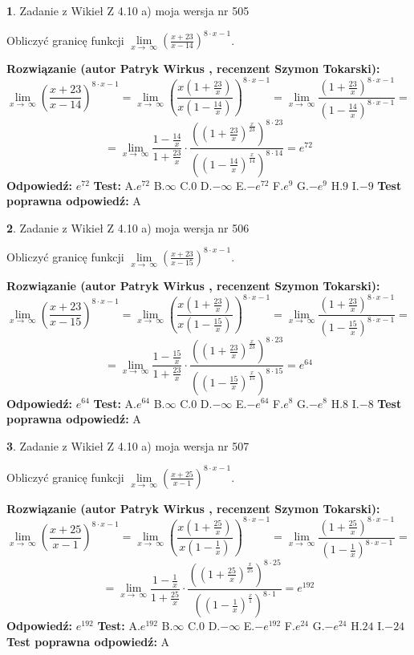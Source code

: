 \documentclass[12pt, a4paper]{article}
\theoremstyle{definition} %
\newtheorem{zad}{}
\newcommand{\zadStart}[1]{\begin{zad}#1\newline}
\newcommand{\zadStop}{\end{zad}}
\newcommand{\rozwStart}[2]{\noindent \textbf{Rozwiązanie (autor #1 , recenzent #2): }\newline}
\newcommand{\rozwStop}{\newline}
\newcommand{\odpStart}{\noindent \textbf{Odpowiedź:}\newline}
\newcommand{\odpStop}{\newline}
\newcommand{\testStart}{\noindent \textbf{Test:}\newline}
\newcommand{\testStop}{\newline}
\newcommand{\kluczStart}{\noindent \textbf{Test poprawna odpowiedź:}\newline}
\newcommand{\kluczStop}{\newline}
\begin{document}
\zadStart{Zadanie z Wikieł Z 4.10 a) moja wersja nr 505}

Obliczyć granicę funkcji  $\lim\limits_{x\to\ \infty}(\frac{x+23}{x-14})^{8\cdot x-1}$.
\zadStop
\rozwStart{Patryk Wirkus}{Szymon Tokarski}
$$\lim\limits_{x\to\ \infty}(\frac{x+23}{x-14})^{8\cdot x-1} = \lim\limits_{x\to\ \infty}(\frac{x(1+\frac{23}{x})}{x(1-\frac{14}{x})})^{8\cdot x-1}=\lim\limits_{x\to\ \infty}\frac{(1+\frac{23}{x})^{8\cdot x-1}}{(1-\frac{14}{x})^{8\cdot x-1}}=$$
$$=\lim\limits_{x\to\ \infty}\frac{1-\frac{14}{x}}{1+\frac{23}{x}}\cdot\frac{((1+\frac{23}{x})^{\frac{x}{23}})^{8\cdot23}}{((1-\frac{14}{x})^{\frac{x}{14}})^{8\cdot14}}=e^{72}$$
\rozwStop
\odpStart
$e^{72}$
\odpStop
\testStart
A.$e^{72}$ B.$\infty$ C.$0$ D.$-\infty$ E.$-e^{72}$
F.$e^{9}$ G.$-e^{9}$
H.$9$
I.$-9$
\testStop
\kluczStart
A
\kluczStop



\zadStart{Zadanie z Wikieł Z 4.10 a) moja wersja nr 506}

Obliczyć granicę funkcji  $\lim\limits_{x\to\ \infty}(\frac{x+23}{x-15})^{8\cdot x-1}$.
\zadStop
\rozwStart{Patryk Wirkus}{Szymon Tokarski}
$$\lim\limits_{x\to\ \infty}(\frac{x+23}{x-15})^{8\cdot x-1} = \lim\limits_{x\to\ \infty}(\frac{x(1+\frac{23}{x})}{x(1-\frac{15}{x})})^{8\cdot x-1}=\lim\limits_{x\to\ \infty}\frac{(1+\frac{23}{x})^{8\cdot x-1}}{(1-\frac{15}{x})^{8\cdot x-1}}=$$
$$=\lim\limits_{x\to\ \infty}\frac{1-\frac{15}{x}}{1+\frac{23}{x}}\cdot\frac{((1+\frac{23}{x})^{\frac{x}{23}})^{8\cdot23}}{((1-\frac{15}{x})^{\frac{x}{15}})^{8\cdot15}}=e^{64}$$
\rozwStop
\odpStart
$e^{64}$
\odpStop
\testStart
A.$e^{64}$ B.$\infty$ C.$0$ D.$-\infty$ E.$-e^{64}$
F.$e^{8}$ G.$-e^{8}$
H.$8$
I.$-8$
\testStop
\kluczStart
A
\kluczStop



\zadStart{Zadanie z Wikieł Z 4.10 a) moja wersja nr 507}

Obliczyć granicę funkcji  $\lim\limits_{x\to\ \infty}(\frac{x+25}{x-1})^{8\cdot x-1}$.
\zadStop
\rozwStart{Patryk Wirkus}{Szymon Tokarski}
$$\lim\limits_{x\to\ \infty}(\frac{x+25}{x-1})^{8\cdot x-1} = \lim\limits_{x\to\ \infty}(\frac{x(1+\frac{25}{x})}{x(1-\frac{1}{x})})^{8\cdot x-1}=\lim\limits_{x\to\ \infty}\frac{(1+\frac{25}{x})^{8\cdot x-1}}{(1-\frac{1}{x})^{8\cdot x-1}}=$$
$$=\lim\limits_{x\to\ \infty}\frac{1-\frac{1}{x}}{1+\frac{25}{x}}\cdot\frac{((1+\frac{25}{x})^{\frac{x}{25}})^{8\cdot25}}{((1-\frac{1}{x})^{\frac{x}{1}})^{8\cdot1}}=e^{192}$$
\rozwStop
\odpStart
$e^{192}$
\odpStop
\testStart
A.$e^{192}$ B.$\infty$ C.$0$ D.$-\infty$ E.$-e^{192}$
F.$e^{24}$ G.$-e^{24}$
H.$24$
I.$-24$
\testStop
\kluczStart
A
\kluczStop
\end{document}

